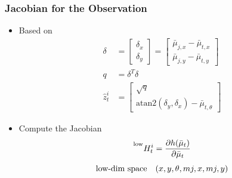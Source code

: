 \begin{frame}
    \frametitle{Jacobian for the Observation}

    \begin{itemize}
        \item Based on
        \begin{align*}
            \delta &= 
            \begin{bmatrix}
                \delta_x \\
                \delta_y
            \end{bmatrix}
            = \begin{bmatrix}
                \bar{\mu}_{j,x} - \bar{\mu}_{t,x} \\
                \bar{\mu}_{j,y} - \bar{\mu}_{t,y}
            \end{bmatrix}\\
            q &= \delta^T \delta\\
            \hat{z}^i_t &= 
            \begin{bmatrix}
                \sqrt{q} \\
                \text{atan2}(\delta_y, \delta_x) - \bar{\mu}_{t,\theta}
            \end{bmatrix}
        \end{align*}    
        \item Compute the Jacobian
        \begin{equation*}
            \prescript{\text{low}}{}{H^{i}_{t}} = \frac{\partial h(\bar{\mu}_t)}{\partial \bar{\mu}_t}
        \end{equation*}
        \begin{equation*}
            \text{low-dim space} \quad (x, y, \theta, m{j,x}, m{j,y})
        \end{equation*}
    \end{itemize}
\end{frame}

